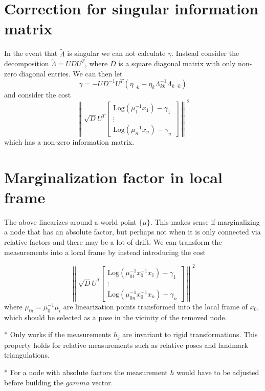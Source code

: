 \section{Correction for singular information matrix}

In the event that $\tilde \Lambda$ is singular we can not calculate $\gamma$. Instead consider the decomposition $\tilde \Lambda = U D U^T$, where $D$ is a square diagonal matrix with only non-zero diagonal entries. We can then let
$$
  \gamma = -U D^{-1} U^T \left( \eta_{\lnot k} - \eta_k \Lambda_{kk}^{-1} \Lambda_{k \lnot k} \right)
$$
and consider the cost
$$
  \left\| \sqrt{D} U^T \begin{bmatrix}
    \mathrm{Log}(\mu_1^{-1} x_1) - \gamma_1 \\
    \vdots                                  \\
    \mathrm{Log}(\mu_n^{-1} x_n) - \gamma_n
  \end{bmatrix} \right\|^2
$$
which has a non-zero information matrix.

\section{Marginalization factor in local frame}

The above linearizes around a world point $\{ \mu \}$. This makes sense if marginalizing a node that has an absolute factor, but perhaps not when it is only connected via relative factors and there may be a lot of drift. We can transform the measurements into a local frame by instead introducing the cost

$$
  \left\| \sqrt{D} U^T \begin{bmatrix}
    \mathrm{Log}(\mu_{01}^{-1} x_0^{-1} x_1) - \gamma_1 \\
    \vdots                                              \\
    \mathrm{Log}( \mu_{0n}^{-1} x_0^{-1} x_n) - \gamma_n
  \end{bmatrix} \right\|^2
$$
where $\mu_{0i} = \mu_0^{-1} \mu_i$ are linearization points transformed into the local frame of $x_0$, which should be selected as a pose in the vicinity of the removed node.

* Only works if the measurements $h_j$ are invariant to rigid transformations. This property holds for relative measurements such as relative poses and landmark triangulations.

* For a node with absolute factors the measurement $h$ would have to be adjusted before building the $gamma$ vector.

